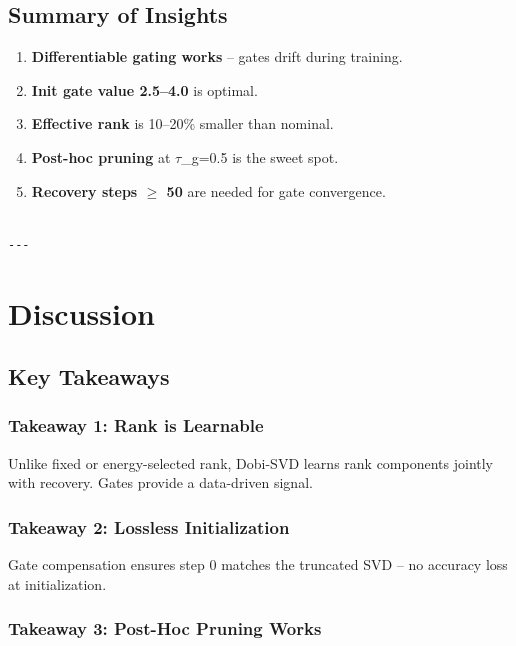 \subsection{Summary of Insights}

\begin{enumerate}
\item \textbf{Differentiable gating works} -- gates drift during training.
\item \textbf{Init gate value 2.5--4.0} is optimal.
\item \textbf{Effective rank} is 10--20\% smaller than nominal.
\item \textbf{Post-hoc pruning} at $\tau$\_g=0.5 is the sweet spot.
\item \textbf{Recovery steps $\ge$ 50} are needed for gate convergence.
\end{enumerate}
\begin{lstlisting}

---
\end{lstlisting}


\section{Discussion}

\subsection{Key Takeaways}

\subsubsection{Takeaway 1: Rank is Learnable}

Unlike fixed or energy-selected rank, Dobi-SVD learns rank components 
jointly with recovery. Gates provide a data-driven signal.

\subsubsection{Takeaway 2: Lossless Initialization}

Gate compensation ensures step 0 matches the truncated SVD -- no accuracy 
loss at initialization.

\subsubsection{Takeaway 3: Post-Hoc Pruning Works}

